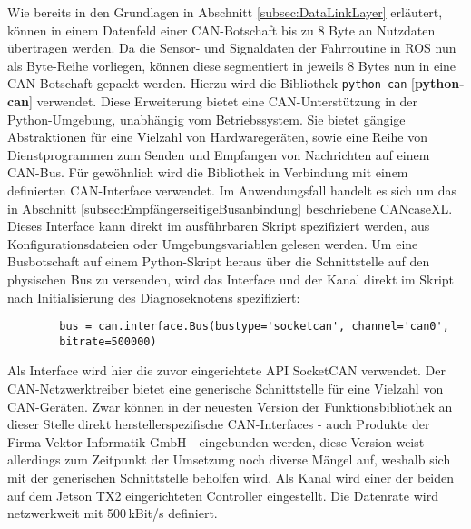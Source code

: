 Wie bereits in den Grundlagen in Abschnitt \ref{subsec:DataLinkLayer} erläutert, können in einem Datenfeld einer CAN-Botschaft bis zu 8 Byte an Nutzdaten übertragen werden. Da die Sensor- und Signaldaten der Fahrroutine in ROS nun als Byte-Reihe vorliegen, können diese segmentiert in jeweils 8 Bytes nun in eine CAN-Botschaft gepackt werden. Hierzu wird die Bibliothek \texttt{python-can} [\textbf{python-can}] verwendet. Diese Erweiterung bietet eine CAN-Unterstützung in der Python-Umgebung, unabhängig vom Betriebssystem. Sie bietet gängige Abstraktionen für eine Vielzahl von Hardwaregeräten, sowie eine Reihe von Dienstprogrammen zum Senden und Empfangen von Nachrichten auf einem CAN-Bus.
Für gewöhnlich wird die Bibliothek in Verbindung mit einem definierten CAN-Interface verwendet. Im Anwendungsfall handelt es sich um das in Abschnitt \ref{subsec:EmpfängerseitigeBusanbindung} beschriebene CANcaseXL. Dieses Interface kann direkt im ausführbaren Skript spezifiziert werden, aus Konfigurationsdateien oder Umgebungsvariablen gelesen werden. Um eine Busbotschaft auf einem Python-Skript heraus über die Schnittstelle auf den physischen Bus zu versenden, wird das Interface und der Kanal direkt im Skript nach Initialisierung des Diagnoseknotens spezifiziert:
\begin{addmargin}[1cm]{0cm} 
	\begin{verbatim}
		bus = can.interface.Bus(bustype='socketcan', channel='can0',
     	bitrate=500000) 
	\end{verbatim}
\end{addmargin}
Als Interface wird hier die zuvor eingerichtete API SocketCAN verwendet. Der CAN-Netzwerktreiber bietet eine generische Schnittstelle für eine Vielzahl von CAN-Geräten. Zwar können in der neuesten Version der Funktionsbibliothek an dieser Stelle direkt herstellerspezifische CAN-Interfaces - auch Produkte der Firma Vektor Informatik GmbH - eingebunden werden, diese Version weist allerdings zum Zeitpunkt der Umsetzung noch diverse Mängel auf, weshalb sich mit der generischen Schnittstelle beholfen wird. Als Kanal wird einer der beiden auf dem Jetson TX2 eingerichteten Controller eingestellt. Die Datenrate wird netzwerkweit mit 500\,kBit/s definiert.\\
